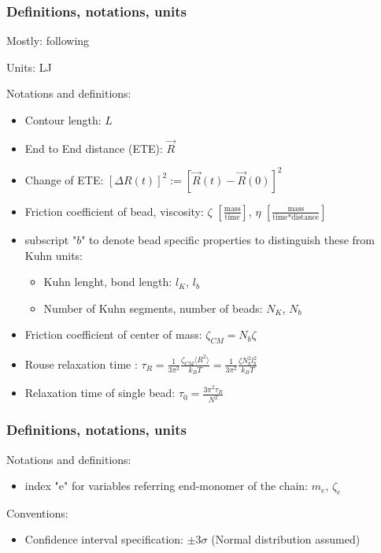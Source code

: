 \documentclass[handout]{beamer}
\newcommand{\mean}[1]{\langle #1 \rangle}
\begin{document}
\begin{frame}
    \frametitle{Definitions, notations, units}
    Mostly: following \cite{svaneborg_2020}

    Units: LJ

    Notations and definitions:

    \begin{itemize}
        \item Contour length: $L$
        \item End to End distance (ETE): $\vec{R}$
        \item Change of ETE: $[\Delta R(t)]^2 := [\vec{R}(t)-\vec{R}(0)]^2$
        \item Friction coefficient of bead, viscosity: $\zeta$ $[\frac{\textrm{mass}}{\textrm{time}}]$, $\eta$ $[\frac{\textrm{mass}}{\textrm{time} * \textrm{distance}}]$
        \item subscript "$b$" to denote bead speciﬁc properties to distinguish these from Kuhn units:
            \begin{itemize}
                \item Kuhn lenght, bond length: $l_K$, $l_b$
                \item Number of Kuhn segments, number of beads: $N_K$, $N_b$
            \end{itemize}
        \item Friction coefficient of center of mass: $\zeta_{CM}=N_b \zeta$ 
        \item Rouse relaxation time \cite{svaneborg_2020}: $\tau_R = \frac{1}{3 \pi^2} \frac{\zeta_{CM} \mean{R^2}}{k_B T} = \frac{1}{3 \pi^2} \frac{\zeta N_b^2 l_b^2}{k_B T}$
        \item Relaxation time of single bead: $\tau_0 = \frac{3\pi^2 \tau_R}{N^2}$ 
    \end{itemize}

\end{frame}

\begin{frame}
    \frametitle{Definitions, notations, units}

    Notations and definitions:

    \begin{itemize}
        \item index "e" for variables referring end-monomer of the chain: $m_e$, $\zeta_e$ 
    \end{itemize}
    \vspace{1cm}
    Conventions:
    \begin{itemize}
        \item Confidence interval specification: $\pm 3\sigma$ (Normal distribution assumed)
    \end{itemize}
\end{frame}
    
\end{document}
